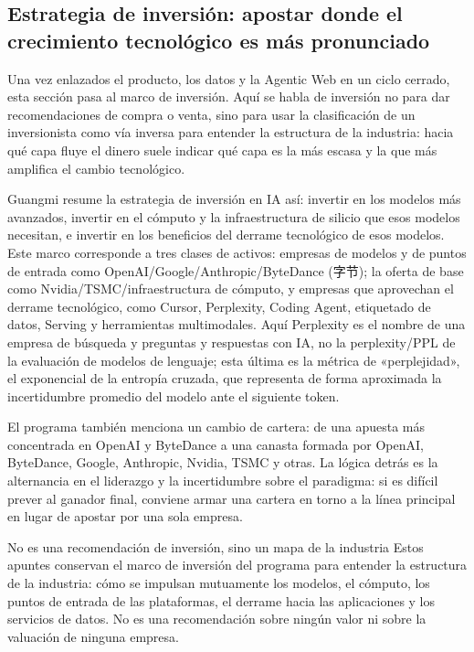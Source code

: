 \subsection{Estrategia de inversión: apostar donde el crecimiento tecnológico es más pronunciado}

Una vez enlazados el producto, los datos y la Agentic Web en un ciclo cerrado, esta sección pasa al marco de inversión. Aquí se habla de inversión no para dar recomendaciones de compra o venta, sino para usar la clasificación de un inversionista como vía inversa para entender la estructura de la industria: hacia qué capa fluye el dinero suele indicar qué capa es la más escasa y la que más amplifica el cambio tecnológico.

Guangmi resume la estrategia de inversión en IA así: invertir en los modelos más avanzados, invertir en el cómputo y la infraestructura de silicio que esos modelos necesitan, e invertir en los beneficios del derrame tecnológico de esos modelos. Este marco corresponde a tres clases de activos: empresas de modelos y de puntos de entrada como OpenAI/Google/Anthropic/ByteDance (字节); la oferta de base como Nvidia/TSMC/infraestructura de cómputo, y empresas que aprovechan el derrame tecnológico, como Cursor, Perplexity, Coding Agent, etiquetado de datos, Serving y herramientas multimodales. Aquí Perplexity es el nombre de una empresa de búsqueda y preguntas y respuestas con IA, no la perplexity/PPL de la evaluación de modelos de lenguaje; esta última es la métrica de «perplejidad», el exponencial de la entropía cruzada, que representa de forma aproximada la incertidumbre promedio del modelo ante el siguiente token.

El programa también menciona un cambio de cartera: de una apuesta más concentrada en OpenAI y ByteDance a una canasta formada por OpenAI, ByteDance, Google, Anthropic, Nvidia, TSMC y otras. La lógica detrás es la alternancia en el liderazgo y la incertidumbre sobre el paradigma: si es difícil prever al ganador final, conviene armar una cartera en torno a la línea principal en lugar de apostar por una sola empresa.

\begin{knowledgebox}{No es una recomendación de inversión, sino un mapa de la industria}
Estos apuntes conservan el marco de inversión del programa para entender la estructura de la industria: cómo se impulsan mutuamente los modelos, el cómputo, los puntos de entrada de las plataformas, el derrame hacia las aplicaciones y los servicios de datos. No es una recomendación sobre ningún valor ni sobre la valuación de ninguna empresa.
\end{knowledgebox}

